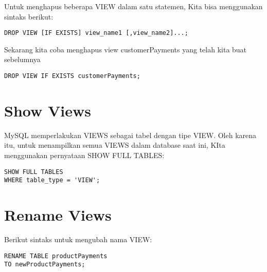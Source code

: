 \documentclass[a4paper]{article}
\begin{document}
Untuk menghapus beberapa VIEW dalam satu statemen, Kita bisa menggunakan sintaks berikut:
\begin{lstlisting}
DROP VIEW [IF EXISTS] view_name1 [,view_name2]...;
\end{lstlisting}

Sekarang kita coba menghapus view customerPayments yang telah kita buat sebelumnya

\begin{lstlisting}
DROP VIEW IF EXISTS customerPayments;
\end{lstlisting}


\section{Show Views}%
\label{sec:show_views}

MySQL memperlakukan VIEWS sebagai tabel dengan tipe VIEW. Oleh karena itu, untuk menampilkan semua VIEWS dalam database saat ini, KIta menggunakan pernyataan SHOW FULL TABLES:

\begin{lstlisting}
SHOW FULL TABLES 
WHERE table_type = 'VIEW';
\end{lstlisting}


\section{Rename Views}%
\label{sec:rename_views}

Berikut sintaks untuk mengubah nama VIEW:

\begin{lstlisting}
RENAME TABLE productPayments
TO newProductPayments;
\end{lstlisting}
\end{document}
